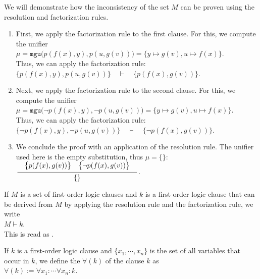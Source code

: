 \noindent
We will demonstrate how the inconsistency of the set $M$ can be proven using the resolution and factorization rules.
\begin{enumerate}
\item First, we apply the factorization rule to the first clause. 
      For this, we compute the unifier 
      \\[0.2cm]
      \hspace*{1.3cm}
      $\mu = \mathtt{mgu}\bigl(p(f(x),y), p(u,g(v))\bigr) = \bigl\{y \mapsto g(v), u \mapsto f(x)\bigr\}$. 
      \\[0.2cm]
      Thus, we can apply the factorization rule: 
      \\[0.2cm]
      \hspace*{1.3cm}
      $\bigl\{p(f(x),y), p(u,g(v))\bigr\} \quad \vdash \quad \bigl\{p(f(x),g(v))\bigr\}$. 
\item Next, we apply the factorization rule to the second clause.
      For this, we compute the unifier 
      \\[0.2cm]
      \hspace*{1.3cm}
      $\mu = \mathtt{mgu}\bigl(\neg p(f(x),y), \neg p(u,g(v))\bigr) = \{y \mapsto g(v), u \mapsto f(x)\}$. 
      \\[0.2cm]
      Thus, we can apply the factorization rule: 
      \\[0.2cm]
      \hspace*{1.3cm}
      $\bigl\{ \neg p(f(x),y), \neg p(u,g(v))\bigr\} \quad \vdash \quad \bigl\{\neg p(f(x),g(v))\bigr\}$.
\item We conclude the proof with an application of the resolution rule.
      The unifier used here is the empty substitution, thus $\mu = \{\}$:    
      \\[0.2cm]
      \hspace*{1.3cm}
      $\schluss{\bigl\{p(f(x),g(v))\bigr\} \quad \bigl\{\neg p(f(x),g(v))\bigr\}}{\{\}}$.
\end{enumerate}

If $M$ is a set of first-order logic clauses and $k$ is a first-order logic
clause that can be derived from $M$ by applying the resolution rule and the factorization rule, we write \\[0.2cm]
\hspace*{1.3cm} $M \vdash k$. 
\\[0.2cm]
This is read as  .

\begin{Definition} 
  If $k$ is a first-order logic clause and $\{x_1,\cdots,x_n\}$
  is the set of all variables that occur in $k$, we define
  the  $\forall(k)$ of the clause $k$ as \\[0.2cm]
  \hspace*{1.3cm} $\forall(k) := \forall x_1\colon \cdots \forall x_n \colon k$. \eox
\end{Definition}

